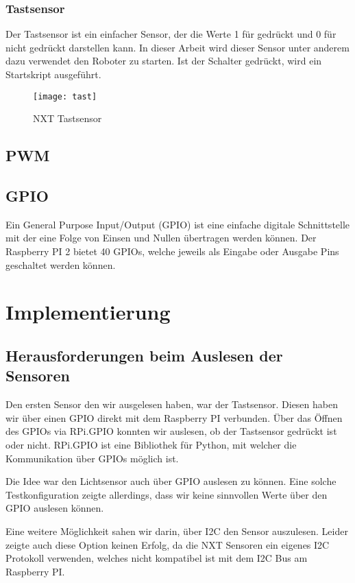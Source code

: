 \subsection{Tastsensor}

Der Tastsensor ist ein einfacher Sensor, der die Werte 1 für gedrückt und 0 für nicht gedrückt darstellen kann. In dieser Arbeit wird dieser Sensor unter anderem dazu verwendet den Roboter zu starten. Ist der Schalter gedrückt, wird ein Startskript ausgeführt.

\begin{figure}[h]
  \centering
  \texttt{[image: tast]}
  \caption{NXT Tastsensor}
  \label{Kap1:tast}
\end{figure}

\section{PWM}

\section{GPIO}
Ein General Purpose Input/Output (GPIO) ist eine einfache digitale Schnittstelle mit der eine Folge von Einsen und Nullen übertragen werden können.
Der Raspberry PI 2 bietet 40 GPIOs, welche jeweils als Eingabe oder Ausgabe Pins geschaltet werden können.

\chapter{Implementierung}

\section{Herausforderungen beim Auslesen der Sensoren}

Den ersten Sensor den wir ausgelesen haben, war der Tastsensor. Diesen haben wir über einen GPIO direkt mit dem Raspberry PI verbunden.
Über das Öffnen des GPIOs via RPi.GPIO konnten wir auslesen, ob der Tastsensor gedrückt ist oder nicht. RPi.GPIO ist eine Bibliothek für Python, mit welcher die Kommunikation über GPIOs möglich ist.

Die Idee war den Lichtsensor auch über GPIO auslesen zu können. Eine solche Testkonfiguration zeigte allerdings, dass wir keine sinnvollen Werte über den GPIO auslesen können. 

Eine weitere Möglichkeit sahen wir darin, über I2C den Sensor auszulesen. Leider zeigte auch diese Option keinen Erfolg, da die NXT Sensoren ein eigenes I2C  Protokoll verwenden, welches nicht kompatibel ist mit dem I2C Bus am Raspberry PI. 

